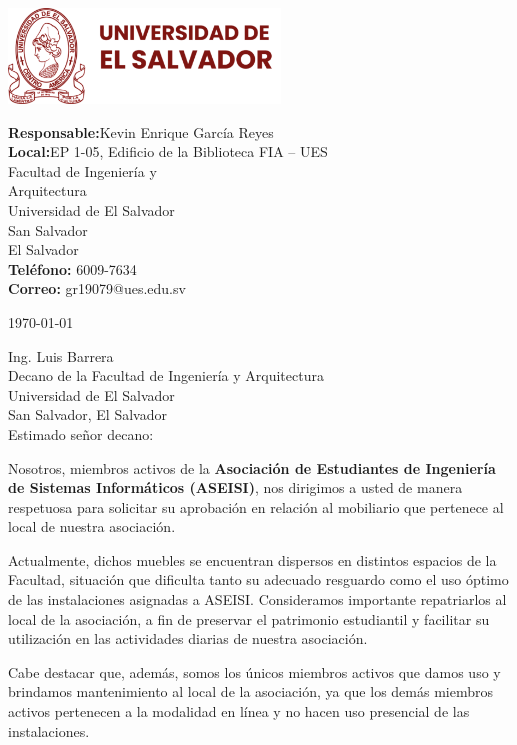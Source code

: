 \documentclass[12pt, a4paper]{letter} %
\begin{document}
\begin{minipage}{0.6\textwidth}
\includegraphics[height=1in]{Logos/ues-logo.png}
\end{minipage}
\hfill
\begin{minipage}{0.4\textwidth}\raggedright
\small{\textbf{\color{umdred}Responsable:}\hphantom{A}Kevin Enrique García Reyes\\
\textbf{\color{umdred}Local:}\hphantom{A}EP 1-05, Edificio de la Biblioteca FIA -- UES\\
\hphantom{AA}Facultad de Ingeniería y\\
\hphantom{AA}Arquitectura\\
\hphantom{AA}Universidad de El Salvador\\
\hphantom{AA}San Salvador\\
\hphantom{AA}El Salvador\\
\textbf{\color{umdred}Teléfono: } 6009-7634\\
\textbf{\color{umdred}Correo: }gr19079@ues.edu.sv }
\end{minipage}

\today

Ing. Luis Barrera\\
Decano de la Facultad de Ingeniería y Arquitectura\\
Universidad de El Salvador\\
San Salvador, El Salvador\\

Estimado señor decano:

Nosotros, miembros activos de la \textbf{Asociación de Estudiantes de Ingeniería de Sistemas Informáticos (ASEISI)}, nos dirigimos a usted de manera respetuosa para solicitar su aprobación en relación al mobiliario que pertenece al local de nuestra asociación.

Actualmente, dichos muebles se encuentran dispersos en distintos espacios de la Facultad, situación que dificulta tanto su adecuado resguardo como el uso óptimo de las instalaciones asignadas a ASEISI. Consideramos importante repatriarlos al local de la asociación, a fin de preservar el patrimonio estudiantil y facilitar su utilización en las actividades diarias de nuestra asociación.

Cabe destacar que, además, somos los únicos miembros activos que damos uso y brindamos mantenimiento al local de la asociación, ya que los demás miembros activos pertenecen a la modalidad en línea y no hacen uso presencial de las instalaciones.
\end{document}
